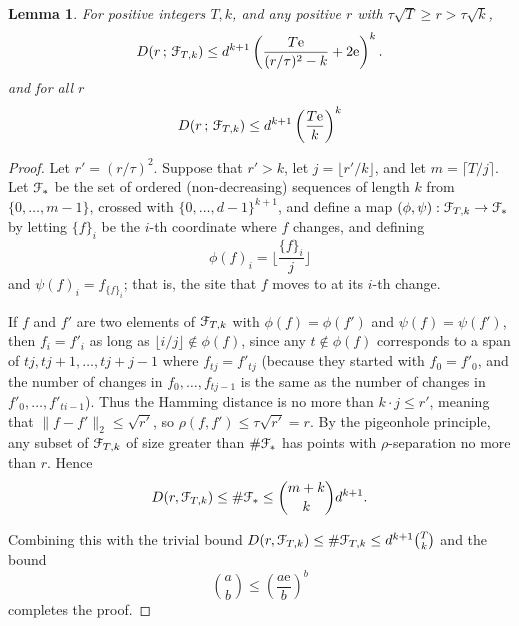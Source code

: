 \documentclass[10pt,a4paper]{amsart}
\theoremstyle{plain}
\newtheorem{lemma}[Thm]{Lemma}
\newcommand{\F}{\eu{F}}
\newcommand{\e}{\mathrm{e}}
\newcommand{\eu}{\EuScript}
\begin{document}
\begin{lemma} \label{L:packingbound}
For positive integers $T,k$, and any positive $r$ with $\tau\sqrt{T} \ge r > \tau \sqrt{k}$,
\begin{equation}  \label{E:packingbound}
D(r \, ;\, \F_{T,k})\le d^{k+1} \left( \frac{T\e}{(r/\tau)^{2}-k}+2\e \right)^{k}.
\end{equation}
and for all $r$
\begin{equation} \label{E:packingbound2}
D(r \, ;\, \F_{T,k}) \le d^{k+1}\left( \frac{T\e}{k} \right)^k
\end{equation}
\end{lemma}

\begin{proof}
Let $r'=(r/\tau)^{2}$. Suppose that $r'>k$, let $j=\lfloor r'/k\rfloor$, and let $m=\lceil T/j\rceil$. Let $\F_{*}$ be the set of ordered (non-decreasing) sequences
of length $k$ from $\{0,\dots,m-1\}$, crossed with $\{0,\dots,d-1\}^{k+1}$, 
and define a map $(\phi,\psi):\F_{T,k}\to \F_{*}$ 
by letting $\{f\}_{i}$ be the $i$-th coordinate where $f$ changes, and defining
$$
\phi(f)_{i}= \bigl\lfloor \frac{\{f\}_{i}}{j}  \bigr\rfloor
$$
and $\psi(f)_{i}=f_{\{f\}_{i}}$; that is, the site that $f$ moves to at its $i$-th
change.

If $f$ and $f'$ are two elements of $\F_{T,k}$ with $\phi(f)=\phi(f')$
and $\psi(f)=\psi(f')$, 
then $f_{i}=f'_{i}$ as long as $\lfloor i/j\rfloor\notin \phi(f)$, 
since any $t\notin \phi(f)$ corresponds to a span of $tj,tj+1,\dots,tj+j-1$
where $f_{tj}=f'_{tj}$ (because they started with $f_{0}=f'_{0}$, and the number
of changes in $f_{0},\dots,f_{tj-1}$ is the same as the number
of changes in $f'_{0},\dots,f'_{ti-1}$). 
Thus the Hamming distance is no more than $k\cdot j \le r'$, meaning that $\|f-f'\|_{2}\le\sqrt{r'}$, so $\rho(f,f')\le \tau\sqrt{r'}=r$. By the
pigeonhole principle, any subset of $\F_{T,k}$ of size greater than $\# \F_{*}$
has points with $\rho$-separation no more than $r$. Hence
$$
D(r,\F_{T,k})\le \#\F_{*} \le \binom{m+k}{k} d^{k+1}.
$$

Combining this with the trivial bound $D(r,\F_{T,k})\le \#\F_{T,k}\le d^{k+1}\binom{T}{k}$ and the bound
$$
\binom{a}{b}\le \left(\frac{a\e}{b}\right)^{b}
$$
completes the proof.
\end{proof}
\end{document}
